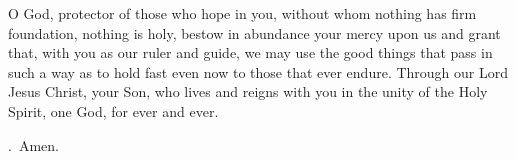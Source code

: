 \lettrine[lines=3]{O}{} God, protector of those who hope in you,
without whom nothing has firm foundation, nothing is holy,
bestow in abundance your mercy upon us
and grant that, with you as our ruler and guide,
we may use the good things that pass
in such a way as to hold fast even now to those that ever endure.
Through our Lord Jesus Christ, your Son,
who lives and reigns with you in the unity of the Holy Spirit,
one God, for ever and ever. \par \Rbar.~Amen.
